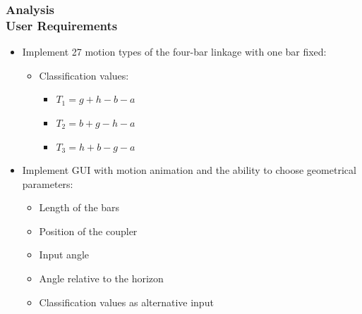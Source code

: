 \documentclass[ucs,10pt]{beamer}
\begin{document}
\begin{frame}
\frametitle{Analysis \\
	\small \color{rwth-blue} User Requirements}
	  \begin{minipage}{\linewidth}
		\centering
		\begin{minipage}{0.6\linewidth}
			\begin{itemize}
				\item Implement 27 motion types of the four-bar linkage with one bar fixed:
				\begin{itemize}
					\item Classification values:
					\begin{itemize}
						\item $T_1 = g + h - b - a$
						\item $T_2 = b + g - h - a$
						\item $T_3 = h + b - g - a$
					\end{itemize}
				\end{itemize}
				\item Implement GUI with motion animation and the ability to choose geometrical parameters:
				\begin{itemize}
					\item Length of the bars
					\item Position of the coupler
					\item Input angle
					\item Angle relative to the horizon
					\item Classification values as alternative input
				\end{itemize}
			\end{itemize}
		\end{minipage}
		\hspace{0.05\linewidth}
		\begin{minipage}{0.31\linewidth}
			\begin{figure}[h]

\end{figure}
\end{minipage}
\end{minipage}
\end{frame}
\end{document}
